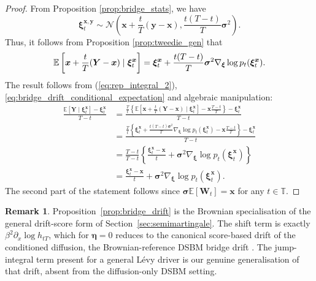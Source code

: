 \documentclass{article}
\newcommand{\levy}{{L\'evy }}
\def\T{\mathbb{T}}
\theoremstyle{definition}
\newtheorem{remark}[proposition]{Remark}
\begin{document}
\begin{proof}
    From Proposition \ref{prop:bridge_stats}, we have
    \begin{equation*}
        \boldsymbol{\xi}^{\boldsymbol{x},\boldsymbol{y}}_t \sim \mathcal{N}\left(\boldsymbol{x} + \frac{t}{T}(\boldsymbol{y} - \boldsymbol{x}), \frac{t(T-t)}{T}\boldsymbol{\sigma}^2\right).
    \end{equation*}
    Thus, it follows from Proposition \ref{prop:tweedie_gen} that
    \begin{equation}\label{eq:bridge_drift_conditional_expectation}
        \mathbb{E}\left[\boldsymbol{x} + \frac{t}{T}(\boldsymbol{Y} - \boldsymbol{x})  \mid \boldsymbol{\xi}_t^{\boldsymbol{x}}\right] = \boldsymbol{\xi}_t^{\boldsymbol{x}} + \frac{t(T-t)}{T}\boldsymbol{\sigma}^2 \nabla_{\boldsymbol{\xi}} \log p_t(\boldsymbol{\xi}^{\boldsymbol{x}}_t).
    \end{equation}
    The result follows from (\ref{eq:rep_integral_2}), \eqref{eq:bridge_drift_conditional_expectation} and algebraic manipulation:
    \begin{align*}
    \frac{\mathbb{E}[\boldsymbol{Y} \mid \boldsymbol{\xi}^{\boldsymbol{x}}_t] - \boldsymbol{\xi}^{\boldsymbol{x}}_t}{T-t} &= \frac{\frac{T}{t} \left\{ \mathbb{E}\left[ \boldsymbol{x} + \frac{t}{T}(\boldsymbol{Y}-\boldsymbol{x}) \mid \boldsymbol{\xi}^{\boldsymbol{x}}_t\right] - \boldsymbol{x}\frac{T-t}{T} \right\} - \boldsymbol{\xi}^{\boldsymbol{x}}_t}{T-t} \\
    &= \frac{\frac{T}{t} \left\{ \boldsymbol{\xi}^{\boldsymbol{x}}_t + \frac{t(T-t)\boldsymbol{\sigma}^2}{T}\nabla_{\boldsymbol{\xi}} \log p_t(\boldsymbol{\xi}^{\boldsymbol{x}}_t) - \boldsymbol{x}\frac{T-t}{T} \right\} - \boldsymbol{\xi}^{\boldsymbol{x}}_t}{T-t} \\
    &= \frac{T-t}{T-t} \left\{ \frac{\boldsymbol{\xi}^{\boldsymbol{x}}_t - \boldsymbol{x}}{t} + \boldsymbol{\sigma}^2 \nabla_{\boldsymbol{\xi}} \log p_t(\boldsymbol{\xi}^{\boldsymbol{x}}_t) \right\} \\
    &= \frac{\boldsymbol{\xi}^{\boldsymbol{x}}_t - \boldsymbol{x}}{t} + \boldsymbol{\sigma}^2 \nabla_{\boldsymbol{\xi}} \log p_t(\boldsymbol{\xi}^{\boldsymbol{x}}_t).
    \end{align*}
		The second part of the statement follows since $\boldsymbol{\sigma}\mathbb{E}[\mathbf{W}_t ] = \boldsymbol{x}$ for any $t\in\T$.
\end{proof}

\begin{remark}
\label{rem:brownian-specialisation}
Proposition~\ref{prop:bridge_drift} is the Brownian specialisation of the general drift-score form of
Section~\ref{sec:semimartingale}. The shift term is exactly $\beta^2\partial_x\log h_{tT}$, which for
$\boldsymbol{\eta}=0$ reduces to the canonical score-based drift of the conditioned diffusion, the
Brownian-reference DSBM bridge drift \cite[Proposition~2]{shi2023diffusion}. The jump-integral term
present for a general \levy driver is our genuine generalisation of that drift, absent from the
diffusion-only DSBM setting.
\end{remark}
\end{document}
